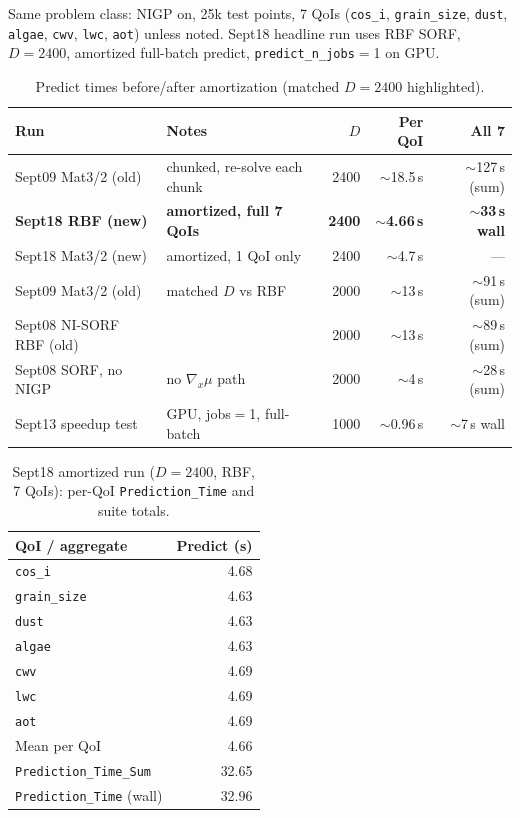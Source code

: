 \documentclass[11pt]{article}
\newcommand{\gradmu}{\nabla_{x}\mu}
\begin{document}
Same problem class: NIGP on, 25k test points, 7 QoIs
(\texttt{cos\_i}, \texttt{grain\_size}, \texttt{dust}, \texttt{algae}, \texttt{cwv},
\texttt{lwc}, \texttt{aot}) unless noted. Sept18 headline run uses RBF SORF,
$D{=}2400$, amortized full-batch predict, \texttt{predict\_n\_jobs}${}={}$1 on GPU.

\begin{table}[ht]
\centering
\small
\caption{Predict times before/after amortization (matched $D{=}2400$ highlighted).}
\label{tab:times}
\begin{tabular}{@{}llrrr@{}}
\toprule
Run & Notes & $D$ & Per QoI & All 7 \\
\midrule
Sept09 Mat3/2 (old) & chunked, re-solve each chunk & 2400 & $\sim$18.5\,s & $\sim$127\,s (sum) \\
\textbf{Sept18 RBF (new)} & \textbf{amortized, full 7 QoIs} & \textbf{2400} &
  \textbf{$\sim$4.66\,s} & \textbf{$\sim$33\,s wall} \\
Sept18 Mat3/2 (new) & amortized, 1 QoI only & 2400 & $\sim$4.7\,s & --- \\
Sept09 Mat3/2 (old) & matched $D$ vs RBF & 2000 & $\sim$13\,s & $\sim$91\,s (sum) \\
Sept08 NI-SORF RBF (old) & & 2000 & $\sim$13\,s & $\sim$89\,s (sum) \\
Sept08 SORF, no NIGP & no $\gradmu$ path & 2000 & $\sim$4\,s & $\sim$28\,s (sum) \\
Sept13 speedup test & GPU, jobs$=$1, full-batch & 1000 & $\sim$0.96\,s & $\sim$7\,s wall \\
\bottomrule
\end{tabular}
\end{table}

\begin{table}[ht]
\centering
\small
\caption{Sept18 amortized run ($D{=}2400$, RBF, 7 QoIs): per-QoI
\texttt{Prediction\_Time} and suite totals.}
\label{tab:sept18-7qoi}
\begin{tabular}{@{}lr@{}}
\toprule
QoI / aggregate & Predict (s) \\
\midrule
\texttt{cos\_i} & 4.68 \\
\texttt{grain\_size} & 4.63 \\
\texttt{dust} & 4.63 \\
\texttt{algae} & 4.63 \\
\texttt{cwv} & 4.69 \\
\texttt{lwc} & 4.69 \\
\texttt{aot} & 4.69 \\
\midrule
Mean per QoI & 4.66 \\
\texttt{Prediction\_Time\_Sum} & 32.65 \\
\texttt{Prediction\_Time} (wall) & 32.96 \\
\bottomrule
\end{tabular}
\end{table}
\end{document}
